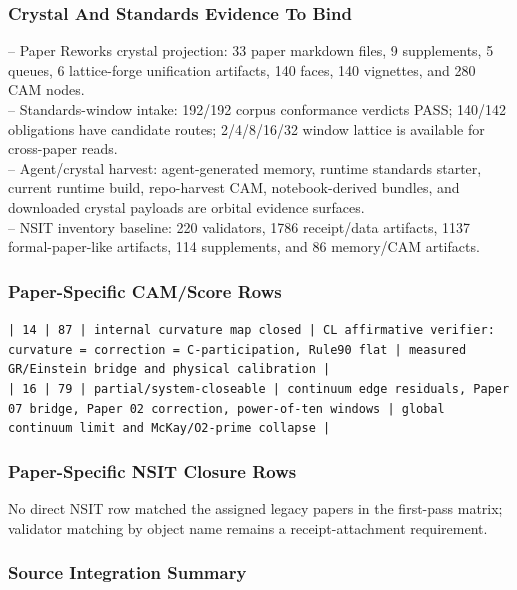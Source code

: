 \documentclass[11pt]{article}
\begin{document}
\subsubsection*{Crystal And Standards Evidence To Bind}

\noindent{}-- Paper Reworks crystal projection: 33 paper markdown files, 9 supplements, 5 queues, 6 lattice-forge unification artifacts, 140 faces, 140 vignettes, and 280 CAM nodes.\\
\noindent{}-- Standards-window intake: 192/192 corpus conformance verdicts PASS; 140/142 obligations have candidate routes; 2/4/8/16/32 window lattice is available for cross-paper reads.\\
\noindent{}-- Agent/crystal harvest: agent-generated memory, runtime standards starter, current runtime build, repo-harvest CAM, notebook-derived bundles, and downloaded crystal payloads are orbital evidence surfaces.\\
\noindent{}-- NSIT inventory baseline: 220 validators, 1786 receipt/data artifacts, 1137 formal-paper-like artifacts, 114 supplements, and 86 memory/CAM artifacts.\\

\subsubsection*{Paper-Specific CAM/Score Rows}

\noindent\texttt{| 14 | 87 | internal curvature map closed | CL affirmative verifier: curvature = correction = C-participation, Rule90 flat | measured GR/Einstein bridge and physical calibration |}\\
\noindent\texttt{| 16 | 79 | partial/system-closeable | continuum edge residuals, Paper 07 bridge, Paper 02 correction, power-of-ten windows | global continuum limit and McKay/O2-prime collapse |}\\

\subsubsection*{Paper-Specific NSIT Closure Rows}

No direct NSIT row matched the assigned legacy papers in the first-pass matrix; validator matching by object name remains a receipt-attachment requirement.

\subsubsection*{Source Integration Summary}
\end{document}
